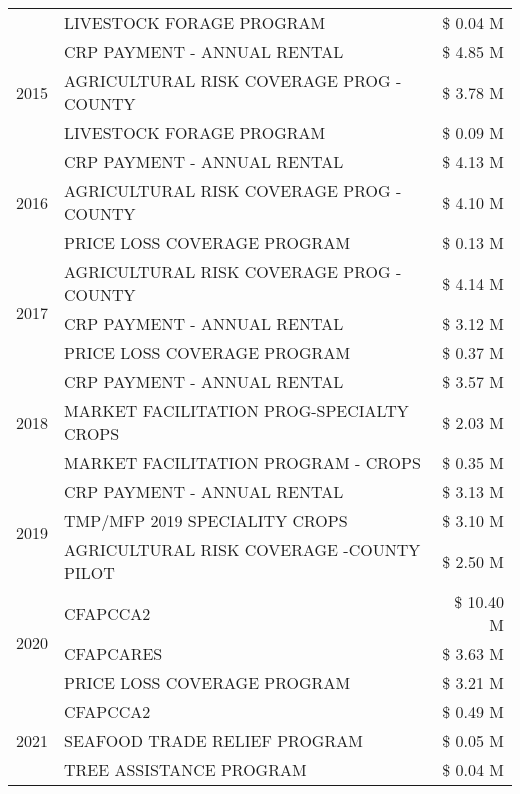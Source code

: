 \begin{tabular}{llr}
 & LIVESTOCK FORAGE PROGRAM & \$ 0.04 M \\
\cline{1-3}
\multirow[t]{3}{*}{2015} & CRP PAYMENT - ANNUAL RENTAL & \$ 4.85 M \\
 & AGRICULTURAL RISK COVERAGE PROG - COUNTY & \$ 3.78 M \\
 & LIVESTOCK FORAGE PROGRAM & \$ 0.09 M \\
\cline{1-3}
\multirow[t]{3}{*}{2016} & CRP PAYMENT - ANNUAL RENTAL & \$ 4.13 M \\
 & AGRICULTURAL RISK COVERAGE PROG - COUNTY & \$ 4.10 M \\
 & PRICE LOSS COVERAGE PROGRAM & \$ 0.13 M \\
\cline{1-3}
\multirow[t]{3}{*}{2017} & AGRICULTURAL RISK COVERAGE PROG - COUNTY & \$ 4.14 M \\
 & CRP PAYMENT - ANNUAL RENTAL & \$ 3.12 M \\
 & PRICE LOSS COVERAGE PROGRAM & \$ 0.37 M \\
\cline{1-3}
\multirow[t]{3}{*}{2018} & CRP PAYMENT - ANNUAL RENTAL & \$ 3.57 M \\
 & MARKET FACILITATION PROG-SPECIALTY CROPS & \$ 2.03 M \\
 & MARKET FACILITATION PROGRAM - CROPS & \$ 0.35 M \\
\cline{1-3}
\multirow[t]{3}{*}{2019} & CRP PAYMENT - ANNUAL RENTAL & \$ 3.13 M \\
 & TMP/MFP 2019 SPECIALITY CROPS & \$ 3.10 M \\
 & AGRICULTURAL RISK COVERAGE -COUNTY PILOT & \$ 2.50 M \\
\cline{1-3}
\multirow[t]{3}{*}{2020} & CFAPCCA2 & \$ 10.40 M \\
 & CFAPCARES & \$ 3.63 M \\
 & PRICE LOSS COVERAGE PROGRAM & \$ 3.21 M \\
\cline{1-3}
\multirow[t]{3}{*}{2021} & CFAPCCA2 & \$ 0.49 M \\
 & SEAFOOD TRADE RELIEF PROGRAM & \$ 0.05 M \\
 & TREE ASSISTANCE PROGRAM & \$ 0.04 M \\
\cline{1-3}
\bottomrule
\end{tabular}
